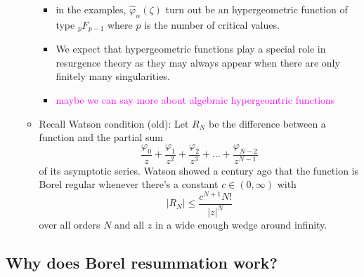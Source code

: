 \documentclass{article}
\begin{document}
\begin{itemize}
\begin{itemize}
\begin{itemize}
\item in the examples, $\hat{\varphi}_\alpha(\zeta)$ turn out be an hypergeometric function of type ${}_pF_{p-1}$ where $p$ is the number of critical values. 
\item We expect that hypergeometric functions play a special role in resurgence theory as they may always appear when there are only finitely many singularities.
\item \textcolor{magenta}{maybe we can say more about algebraic hypergeomtric functions}
\end{itemize}
\item Recall Watson condition (old): Let $R_N$ be the difference between a function and the partial sum
\[ \frac{\varphi_0}{z} + \frac{\varphi_1}{z^2} + \frac{\varphi_2}{z^3} + \ldots + \frac{\varphi_{N-2}}{z^{N-1}} \]
of its asymptotic series. Watson showed a century ago that the function is Borel regular whenever there's a constant $c \in (0, \infty)$ with
\[ |R_N| \le \frac{c^{N+1} N!}{|z|^N} \]
over all orders $N$ and all $z$ in a wide enough wedge around infinity.
\end{itemize}
\end{itemize}
\color{DarkBlue}
\subsection{Why does Borel resummation work?}

\color{gray}
\end{document}
